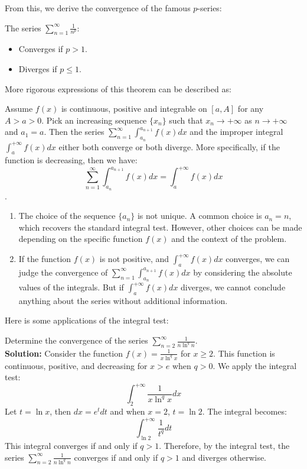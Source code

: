 \documentclass[oneside]{book}
\begin{document}
From this, we derive the convergence of the famous $p$-series:
\begin{corollary}[$p$-Series]
The series $\sum_{n=1}^{\infty} \frac{1}{n^p}$:
\begin{itemize}
    \item Converges if $p > 1$.
    \item Diverges if $p \le 1$.
\end{itemize}
\end{corollary}

More rigorous expressions of this theorem can be described as:

\begin{theorem}
    Assume $f(x)$ is continuous, positive and integrable on $[a,A]$ for any $A>a>0$. Pick an increasing sequence $\{x_n\}$ such that $x_n \to +\infty$ as $n \to +\infty$ and $a_1 = a$. Then the series $\sum_{n=1}^{\infty} \int_{a_n}^{a_{n+1}} f(x) dx$ and the improper integral $\int_a^{+\infty} f(x) dx$ either both converge or both diverge. 
    More specifically, if the function is decreasing, then we have:
    \[\sum_{n=1}^{\infty} \int_{a_n}^{a_{n+1}} f(x) dx = \int_a^{+\infty} f(x) dx\].
\end{theorem}

\begin{remark}
    \begin{enumerate}
        \item The choice of the sequence $\{a_n\}$ is not unique. A common choice is $a_n = n$, which recovers the standard integral test. However, other choices can be made depending on the specific function $f(x)$ and the context of the problem.
        \item If the function $f(x)$ is not positive, and $\int_a^{+\infty} f(x) dx$ converges, we can judge the convergence of $\sum_{n=1}^{\infty} \int_{a_n}^{a_{n+1}} f(x) dx$ by considering the absolute values of the integrals. But if $\int_a^{+\infty} f(x) dx$ diverges, we cannot conclude anything about the series without additional information.
    \end{enumerate}
\end{remark}

Here is some applications of the integral test:

\newpage

\begin{example}
    Determine the convergence of the series $\sum_{n=2}^{\infty} \frac{1}{n \ln^q n}$. \\
    \textbf{Solution:} Consider the function $f(x) = \frac{1}{x \ln^q x}$ for $x \ge 2$. This function is continuous, positive, and decreasing for $x > e$ when $q > 0$. We apply the integral test:
    \[\int_2^{+\infty} \frac{1}{x \ln^q x} dx \]
    Let $t = \ln x$, then $dx = e^t dt$ and when $x = 2$, $t = \ln 2$. The integral becomes:
    \[\int_{\ln 2}^{+\infty} \frac{1}{t^q} dt \]
    This integral converges if and only if $q > 1$. Therefore, by the integral test, the series $\sum_{n=2}^{\infty} \frac{1}{n \ln^q n}$ converges if and only if $q > 1$ and diverges otherwise.
\end{example}
\end{document}
